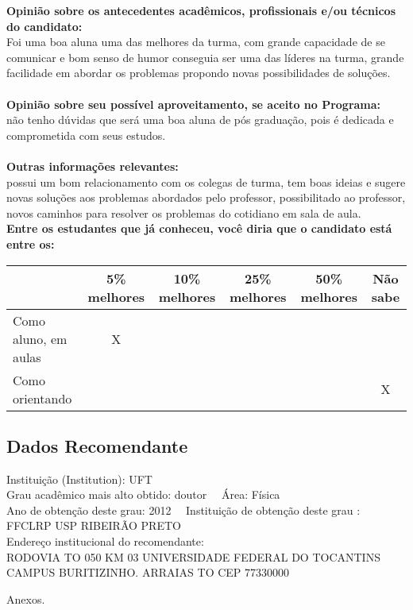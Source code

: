 \documentclass[11pt]{article}
\begin{document}
\textbf{Opinião sobre os antecedentes acadêmicos, profissionais e/ou técnicos do candidato:}
\\Foi uma boa aluna uma das melhores da turma, com grande capacidade de se comunicar e bom senso de humor conseguia ser uma das líderes na turma, grande facilidade em abordar os problemas propondo novas possibilidades de soluções.\\
\\
\textbf{Opinião sobre seu possível aproveitamento, se aceito no Programa:}
\\não tenho dúvidas que será uma boa aluna de pós graduação, pois é dedicada e comprometida com seus estudos.\\ 
\\
\textbf{Outras informações relevantes:} \\possui um bom relacionamento com os colegas de turma, tem boas ideias e sugere novas soluções aos problemas abordados pelo professor, possibilitado ao professor, novos caminhos para resolver os problemas do cotidiano em sala de aula.
\\[0.3cm]
\textbf{Entre os estudantes que já conheceu, você diria que o candidato está entre os:}
\\
\begin{tabular}{|l|c|c|c|c|c|}
\hline
 & 5\% melhores & 10\% melhores & 25\% melhores & 50\% melhores & Não sabe \\
\hline
Como aluno, em aulas & X &  &  &  & \\
\hline
Como orientando &  &  &  &  & X\\
\hline
\end{tabular}
\subsection*{Dados Recomendante} 
	Instituição (Institution): UFT
\\ 
	Grau acadêmico mais alto obtido: doutor
	\ \ Área: Física
	\\
	Ano de obtenção deste grau: 2012
	\ \ 
	Instituição de obtenção deste grau : FFCLRP USP RIBEIRÃO PRETO
	\\ 
	Endereço institucional do recomendante: \\ RODOVIA TO 050 KM 03 UNIVERSIDADE FEDERAL DO TOCANTINS CAMPUS BURITIZINHO. 
ARRAIAS TO
CEP 77330000 
\begin{center}
Anexos.
\end{center}
\end{document}
